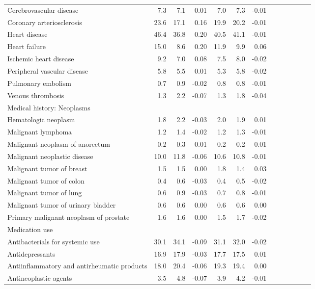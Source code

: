 \documentclass[11pt,]{article}
\begin{document}
\begin{longtable}{lrrrrrrrrrrrr}
      Cerebrovascular disease &  7.3 &  7.1 &  0.01 &  7.0 &  7.3 & -0.01 \\ 
      Coronary arteriosclerosis & 23.6 & 17.1 &  0.16 & 19.9 & 20.2 & -0.01 \\ 
      Heart disease & 46.4 & 36.8 &  0.20 & 40.5 & 41.1 & -0.01 \\ 
      Heart failure & 15.0 &  8.6 &  0.20 & 11.9 &  9.9 &  0.06 \\ 
      Ischemic heart disease &  9.2 &  7.0 &  0.08 &  7.5 &  8.0 & -0.02 \\ 
      Peripheral vascular disease &  5.8 &  5.5 &  0.01 &  5.3 &  5.8 & -0.02 \\ 
      Pulmonary embolism &  0.7 &  0.9 & -0.02 &  0.8 &  0.8 & -0.01 \\ 
      Venous thrombosis &  1.3 &  2.2 & -0.07 &  1.3 &  1.8 & -0.04 \\ 
  Medical history: Neoplasms &    &    &     &    &    &     \\ 
      Hematologic neoplasm &  1.8 &  2.2 & -0.03 &  2.0 &  1.9 &  0.01 \\ 
      Malignant lymphoma &  1.2 &  1.4 & -0.02 &  1.2 &  1.3 & -0.01 \\ 
      Malignant neoplasm of anorectum &  0.2 &  0.3 & -0.01 &  0.2 &  0.2 & -0.01 \\ 
      Malignant neoplastic disease & 10.0 & 11.8 & -0.06 & 10.6 & 10.8 & -0.01 \\ 
      Malignant tumor of breast &  1.5 &  1.5 &  0.00 &  1.8 &  1.4 &  0.03 \\ 
      Malignant tumor of colon &  0.4 &  0.6 & -0.03 &  0.4 &  0.5 & -0.02 \\ 
      Malignant tumor of lung &  0.6 &  0.9 & -0.03 &  0.7 &  0.8 & -0.01 \\ 
      Malignant tumor of urinary bladder &  0.6 &  0.6 &  0.00 &  0.6 &  0.6 &  0.00 \\ 
      Primary malignant neoplasm of prostate &  1.6 &  1.6 &  0.00 &  1.5 &  1.7 & -0.02 \\ 
  Medication use &    &    &     &    &    &     \\ 
      Antibacterials for systemic use & 30.1 & 34.1 & -0.09 & 31.1 & 32.0 & -0.02 \\ 
      Antidepressants & 16.9 & 17.9 & -0.03 & 17.7 & 17.5 &  0.01 \\ 
      Antiinflammatory and antirheumatic products & 18.0 & 20.4 & -0.06 & 19.3 & 19.4 &  0.00 \\ 
      Antineoplastic agents &  3.5 &  4.8 & -0.07 &  3.9 &  4.2 & -0.01 \\ 

\end{longtable}
\end{document}
